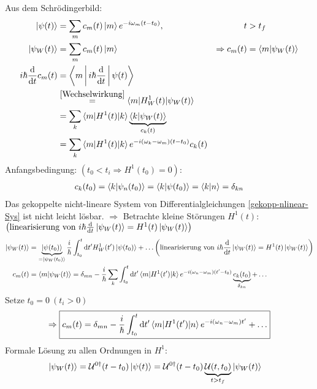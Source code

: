 	Aus dem Schrödingerbild: 
		\begin{align}
			\ket{\psi(t)} &= \sum_m c_m(t) \ket{m} e^{-i \omega_m (t-t_0)} ,& t&>t_f \nonumber \\
			\ket{\psi_W(t)} &= \sum_m c_m(t) \ket{m} &\Rightarrow c_m(t) &= \braket{m | \psi_W(t)} \nonumber \\
			i\hbar \frac{\mathrm{d}}{\mathrm{d} t} c_m(t) 
			&= \Braket{m | i\hbar \frac{\mathrm{d}}{\mathrm{d} t} | \psi(t)} \nonumber\\
			&\overset{\eqref{Wechselwirkung}}{=} \braket{m | H^1_W(t) | \psi_W(t)} \nonumber\\
			&= \sum_k \braket{m | H^1(t) | k} \underbrace{\braket{k | \psi_W(t)}}_{\substack{c_k(t)}} \nonumber\\ 
			\label{gekopp-nlinear-Sys}
			&= \sum_k \braket{m | H^1(t) | k} e^{-i(\omega_k - \omega_m)(t - t_0)} c_k(t) 
		\end{align}
	Anfangsbedingung: $(t_0 < t_i \Rightarrow H^1(t_0) = 0):$
		\begin{align*} 
			c_k(t_0) = \braket{k | \psi_n(t_0)} = \braket{k | \psi(t_0)} = \braket{k | n} = \delta_{kn}
		\end{align*} 	
	Das gekoppelte nicht-lineare System von Differentialgleichungen \eqref{gekopp-nlinear-Sys} ist nicht leicht lösbar. $\Rightarrow$ Betrachte \glqq kleine\grqq{} Störungen $H^1(t)$: $\left( \text{linearisierung von~} i\hbar \frac{\mathrm{d}}{\mathrm{d} t} \ket{\psi_W(t)} = H^1(t) \ket{\psi_W(t)}\right) $
		\begin{align*}
			\ket{\psi_W(t)} &= \underbrace{\ket{\psi(t_0)}}_{\substack{=\ket{\psi_W(t_0)}}} 
			\frac{i}{\hbar} \int_{t_0}^{t} \mathrm{d} t' H^1_W(t') \ket{\psi(t_0)} + \ldots 
			\left( \text{linearisierung von~} i\hbar \frac{\mathrm{d}}{\mathrm{d} t} \ket{\psi_W(t)} = H^1(t) \ket{\psi_W(t)}\right) \\
			c_m(t) &= \braket{m | \psi_W(t)} 
			= \delta_{mn} - \frac{i}{\hbar} \sum_k \int_{t_0}^{t} \mathrm{d} t' \braket{m | H^1(t') | k} e^{-i(\omega_n - \omega_m)(t'-t_0)} 
			\underbrace{c_k(t_0)}_{\substack{\delta_{kn}}} + \ldots
		\end{align*}
	Setze $t_0=0 ~ (t_i>0)$
		\begin{equation*}
			\Rightarrow \boxed{c_m(t) = \delta_{mn} 
				- \frac{i}{\hbar} \int_{t_0}^{t} \mathrm{d} t' \braket{m | H^1(t') | n} e^{-i(\omega_n - \omega_m) t'} + \ldots}
		\end{equation*}
	Formale Lösung zu allen Ordnungen in $H^1$:	
		\begin{align*}
			\ket{\psi_W(t)} &= \mathcal{U}^{0\dagger} (t-t_0) \ket{\psi(t)}
			= \mathcal{U}^{0\dagger} (t-t_0) \underbrace{\mathcal{U} (t,t_0)}_{\substack{t>t_f}} \ket{\psi_W(t)}
		\end{align*}

